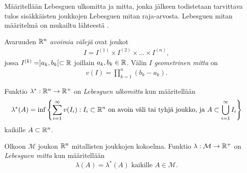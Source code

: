 \documentclass[12pt,oneside,a4paper]{amsbook} %
\begin{document}
Määritellään Lebesguen ulkomitta ja mitta, jonka jälkeen todistetaan tarvittava tulos sisäkkäisten joukkojen Lebesguen mitan raja-arvosta. Lebesguen mitan määritelmä on mukailtu lähteestä \cite[s. 40]{lehrbäck}.

\begin{definition}
    Avaruuden $\mathbb{R}^n$ \textit{avoimia välejä} ovat joukot
    \begin{align*}
        I = I^{(1)} \times I^{(2)} \times ... \times I^{(n)},
    \end{align*}
    jossa $I^{(k)} = ]a_k, b_k[ \subset \mathbb{R}$ joillain $a_k, b_k \in \mathbb{R}$.
    Välin $I$ \textit{geometrinen mitta} on
    \begin{align*}
        v(I) = \prod_{k=1}^n(b_k-a_k).
    \end{align*}
\end{definition}

\begin{definition}
    Funktio $\lambda^* : \mathbb{R}^n \to \mathbb{R}^+$ on \textit{Lebesguen ulkomitta} kun määritellään
    $$\lambda^*(A) = \inf\left\{\sum_{i=1}^\infty v(I_i) : I_i \subset \mathbb{R}^n \text{ on avoin väli tai tyhjä joukko, ja } A \subset \bigcup_{i=1}^{\infty}I_i\right\}$$
    kaikille $A \subset \mathbb{R}^n$.
\end{definition}

\begin{definition}
    Olkoon $\mathcal M$ joukon $\mathbb{R}^n$ mitallisten joukkojen kokoelma. Funktio $\lambda : \mathcal M \to \mathbb{R}^+$ on \textit{Lebesguen mitta} kun määritellään
    $$\lambda(A) = \lambda^*(A) \text{ kaikille } A \in \mathcal M.$$
\end{definition}
\end{document}
